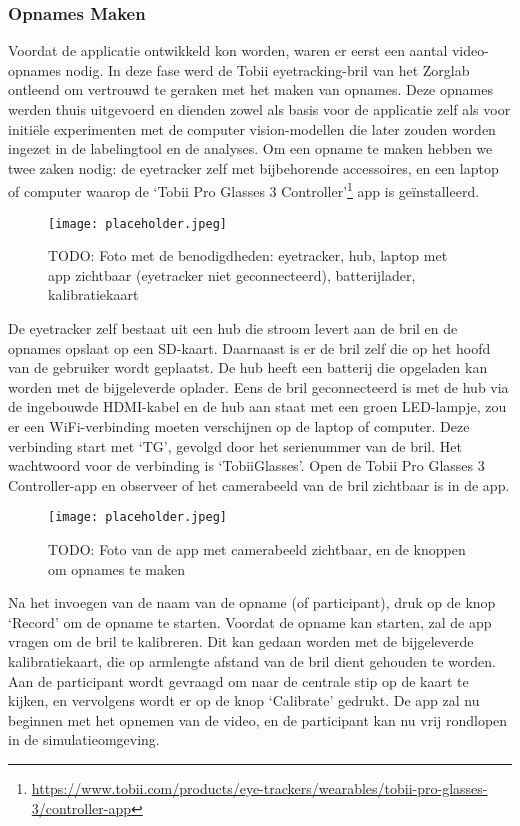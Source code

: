 \subsubsection{Opnames Maken}

Voordat de applicatie ontwikkeld kon worden, waren er eerst een aantal video-opnames nodig. 
In deze fase werd de Tobii eyetracking-bril van het Zorglab ontleend om vertrouwd te geraken met het maken van opnames. 
Deze opnames werden thuis uitgevoerd en dienden zowel als basis voor de applicatie zelf als voor initiële experimenten met de computer vision-modellen die later zouden worden ingezet in de labelingtool en de analyses.
Om een opname te maken hebben we twee zaken nodig: de eyetracker zelf met bijbehorende accessoires, en een laptop of computer waarop de `Tobii Pro Glasses 3 Controller'\footnote{\url{https://www.tobii.com/products/eye-trackers/wearables/tobii-pro-glasses-3/controller-app}} app is geïnstalleerd.

\begin{figure}[H]
  \centering
  \texttt{[image: placeholder.jpeg]}
  \caption[]{\label{fig:todo} TODO: Foto met de benodigdheden: eyetracker, hub, laptop met app zichtbaar (eyetracker niet geconnecteerd), batterijlader, kalibratiekaart
 }
\end{figure}

De eyetracker zelf bestaat uit een hub die stroom levert aan de bril en de opnames opslaat op een SD-kaart. Daarnaast is er de bril zelf die op het hoofd van de gebruiker wordt geplaatst.
De hub heeft een batterij die opgeladen kan worden met de bijgeleverde oplader. 
Eens de bril geconnecteerd is met de hub via de ingebouwde HDMI-kabel en de hub aan staat met een groen LED-lampje, zou er een WiFi-verbinding moeten verschijnen op de laptop of computer.
Deze verbinding start met `TG', gevolgd door het serienummer van de bril. Het wachtwoord voor de verbinding is `TobiiGlasses'. 
Open de Tobii Pro Glasses 3 Controller-app en observeer of het camerabeeld van de bril zichtbaar is in de app.

\begin{figure}[H]
  \centering
  \texttt{[image: placeholder.jpeg]}
  \caption[]{\label{fig:todo} TODO: Foto van de app met camerabeeld zichtbaar, en de knoppen om opnames te maken
 }
\end{figure}

Na het invoegen van de naam van de opname (of participant), druk op de knop `Record' om de opname te starten.
Voordat de opname kan starten, zal de app vragen om de bril te kalibreren. 
Dit kan gedaan worden met de bijgeleverde kalibratiekaart, die op armlengte afstand van de bril dient gehouden te worden.
Aan de participant wordt gevraagd om naar de centrale stip op de kaart te kijken, en vervolgens wordt er op de knop `Calibrate' gedrukt.
De app zal nu beginnen met het opnemen van de video, en de participant kan nu vrij rondlopen in de simulatieomgeving.

